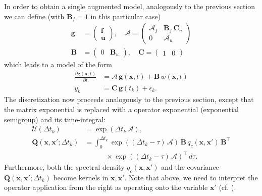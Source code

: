\documentclass[journal]{IEEEtran}
\begin{document}
In order to obtain a single augmented model, analogously to the previous section we can define (with $\mathbf{B}_f = 1$ in this particular case)
%
\begin{equation}
\begin{split}
  \mathbf{g} &= \begin{pmatrix}
	\mathbf{f} \\ \mathbf{u}
  \end{pmatrix}, \quad
  \mathbf{\mathcal{A}}
  = \begin{pmatrix}
	\mathbf{\mathcal{A}}_f & \mathbf{B}_f \, \mathbf{C}_u \\
	0 & \mathbf{\mathcal{A}}_u
  \end{pmatrix} \\
  \mathbf{B}
  &= \begin{pmatrix}
	0 & \mathbf{B}_u
  \end{pmatrix}, \quad
  \mathbf{C}
  = \begin{pmatrix}
	1 & 0
  \end{pmatrix}
\end{split}
\end{equation}
%
which leads to a model of the form
%
\begin{equation}
\begin{split}
  \frac{\partial \mathbf{g}(\mathbf{x},t)}{\partial t}
  &= \mathbf{\mathcal{A}} \, \mathbf{g}(\mathbf{x},t)
  + \mathbf{B} \, w(\mathbf{x},t) \\
  y_k &= \mathbf{C} \, \mathbf{g}(t_k) + \epsilon_k.
\end{split}
\label{eq:ssaug2}
\end{equation}
%
The discretization now proceeds analogously to the previous section, except that the matrix exponential is replaced with a operator exponential (exponential semigroup) and its time-integral:
%
\begin{equation}
\begin{split}
  \mathbf{\mathcal{U}}(\Delta t_k)  &= \exp(\Delta t_k \, \mathbf{\mathcal{A}}), \\
  \mathbf{Q}(\mathbf{x},\mathbf{x}';\Delta t_k) &= \int_0^{\Delta t_k} \exp((\Delta t_k - \tau) \, 
  \mathbf{\mathcal{A}}) \,
  \mathbf{B} \, q_c(\mathbf{x},\mathbf{x}')  \, \mathbf{B}^{\top} \\
  &\qquad \quad \times \exp((\Delta t_k - \tau) \, \mathbf{\mathcal{A}})^{\top} \, d\tau.
\end{split}
\label{eq:dssaug}
\end{equation}
%
Furthermore, both the spectral density $q_c(\mathbf{x},\mathbf{x}')$ and the covariance $\mathbf{Q}(\mathbf{x},\mathbf{x}';\Delta t_k)$ become kernels in $\mathbf{x},\mathbf{x}'$. Note that above, we need to interpret the operator application from the right as operating onto the variable $\mathbf{x}'$ (cf. \cite{Sarkka+Hartikainen:2012}).
\end{document}
